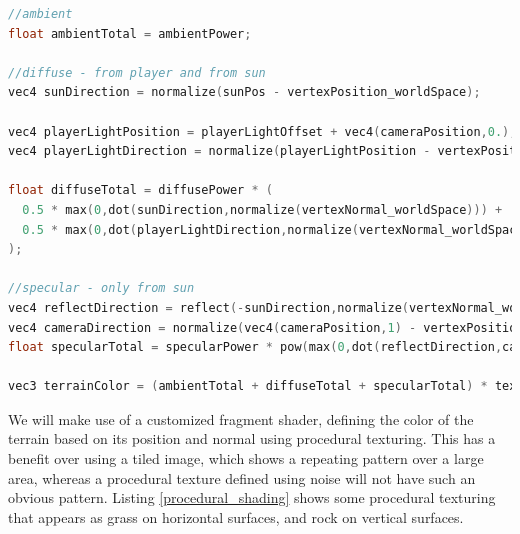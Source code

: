 \documentclass[11pt]{article}
\begin{document}
\begin{lstlisting}[language=C++,label={lighting},caption={Part of the fragment shader used to determine the light intensity for a given pixel.}]
//ambient
float ambientTotal = ambientPower;

//diffuse - from player and from sun
vec4 sunDirection = normalize(sunPos - vertexPosition_worldSpace);

vec4 playerLightPosition = playerLightOffset + vec4(cameraPosition,0.);
vec4 playerLightDirection = normalize(playerLightPosition - vertexPosition_worldSpace);

float diffuseTotal = diffusePower * (
  0.5 * max(0,dot(sunDirection,normalize(vertexNormal_worldSpace))) +
  0.5 * max(0,dot(playerLightDirection,normalize(vertexNormal_worldSpace)))
);

//specular - only from sun
vec4 reflectDirection = reflect(-sunDirection,normalize(vertexNormal_worldSpace));
vec4 cameraDirection = normalize(vec4(cameraPosition,1) - vertexPosition_worldSpace);
float specularTotal = specularPower * pow(max(0,dot(reflectDirection,cameraDirection)),specularExponent);

vec3 terrainColor = (ambientTotal + diffuseTotal + specularTotal) * textureColor;
\end{lstlisting}
We will make use of a customized fragment shader, defining the color of the terrain based on its position and normal using procedural texturing. This has a benefit over using a tiled image, which shows a repeating pattern over a large area, whereas a procedural texture defined using noise will not have such an obvious pattern. Listing \ref{procedural_shading} shows some procedural texturing that appears as grass on horizontal surfaces, and rock on vertical surfaces.
\end{document}
